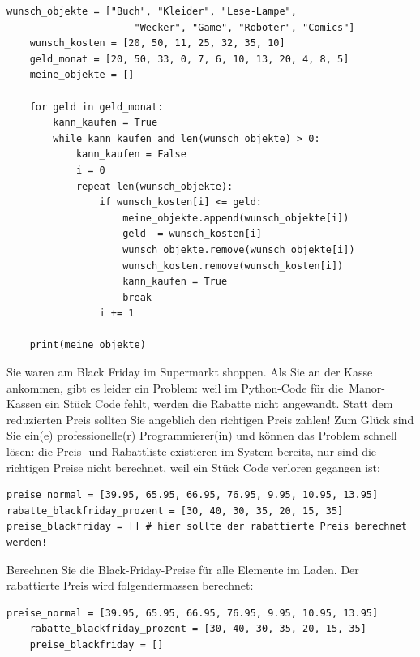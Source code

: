 \begin{questions}
\begin{solution}
    \begin{lstlisting}[style=TigerJython]
    wunsch_objekte = ["Buch", "Kleider", "Lese-Lampe",
                      "Wecker", "Game", "Roboter", "Comics"]
    wunsch_kosten = [20, 50, 11, 25, 32, 35, 10]
    geld_monat = [20, 50, 33, 0, 7, 6, 10, 13, 20, 4, 8, 5]
    meine_objekte = []

    for geld in geld_monat:
        kann_kaufen = True
        while kann_kaufen and len(wunsch_objekte) > 0:
            kann_kaufen = False
            i = 0
            repeat len(wunsch_objekte):
                if wunsch_kosten[i] <= geld:
                    meine_objekte.append(wunsch_objekte[i])
                    geld -= wunsch_kosten[i]
                    wunsch_objekte.remove(wunsch_objekte[i])
                    wunsch_kosten.remove(wunsch_kosten[i])
                    kann_kaufen = True
                    break
                i += 1

    print(meine_objekte)
    \end{lstlisting}

  \end{solution}

\clearpage
{}

Sie waren am Black Friday im Supermarkt shoppen. Als Sie an der Kasse ankommen, gibt es leider ein Problem: weil im Python-Code für die Manor-Kassen ein Stück Code fehlt, werden die Rabatte nicht angewandt. Statt dem reduzierten Preis sollten Sie angeblich den richtigen Preis zahlen! Zum Glück sind Sie ein(e) professionelle(r) Programmierer(in) und können das Problem schnell lösen: die Preis- und Rabattliste existieren im System bereits, nur sind die richtigen Preise nicht berechnet, weil ein Stück Code verloren gegangen ist:
\begin{lstlisting}[style=TigerJython]
preise_normal = [39.95, 65.95, 66.95, 76.95, 9.95, 10.95, 13.95]
rabatte_blackfriday_prozent = [30, 40, 30, 35, 20, 15, 35]
preise_blackfriday = [] # hier sollte der rabattierte Preis berechnet werden!
\end{lstlisting}
Berechnen Sie die Black-Friday-Preise für alle Elemente im Laden. Der rabattierte Preis wird folgendermassen berechnet:\\
	\begin{solution}
    \begin{lstlisting}[style=TigerJython]
    preise_normal = [39.95, 65.95, 66.95, 76.95, 9.95, 10.95, 13.95]
    rabatte_blackfriday_prozent = [30, 40, 30, 35, 20, 15, 35]
    preise_blackfriday = []


\end{lstlisting}
\end{solution}
\end{questions}
